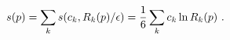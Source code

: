 \begin{equation}\label{a.3}
s(p)=\sum_k s(c_k,R_k(p)/\epsilon)=
{1 \over 6} \sum_k c_k\ln R_k(p)~.
\end{equation}

